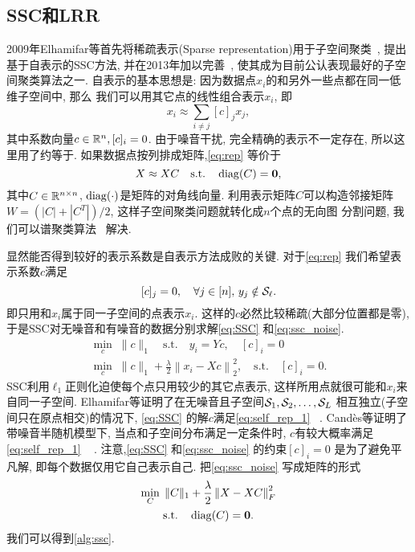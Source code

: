 \subsection{SSC和LRR}
2009年Elhamifar等首先将稀疏表示(Sparse representation)用于子空间聚类~\cite{elhamifar2009sparse}, 
提出基于自表示的SSC方法, 并在2013年加以完善~\cite{elhamifar2013sparse}, 使其成为目前公认表现最好的子空间聚类算法之一.
自表示的基本思想是: 因为数据点\(x_i\)的和另外一些点都在同一低维子空间中, 那么 
我们可以用其它点的线性组合表示\(x_i\), 即
\begin{equation}
  x_i \approx \sum_{i\neq j} [c]_j x_j, 
  \label{eq:rep}
\end{equation}
其中系数向量\(c\in \mathbb{R}^n, [c]_i = 0\). 
由于噪音干扰, 完全精确的表示不一定存在, 所以这里用了约等于.
如果数据点按列排成矩阵,\eqref{eq:rep} 等价于
\begin{equation}
  X \approx XC \quad \text{s.t.}\quad \operatorname{diag}(C) = \mathbf{0},
  \label{eq:matrix_rep}
\end{equation}
其中\(C\in \mathbb{R}^{n\times n}\), \(\operatorname{diag}(\cdot)\)是矩阵的对角线向量.
利用表示矩阵\(C\)可以构造邻接矩阵\(W=(|C|+|C^T|)/2\),
这样子空间聚类问题就转化成\(n\)个点的无向图
分割问题, 我们可以谱聚类算法~\cite{ng2002spectral} 解决.

显然能否得到较好的表示系数是自表示方法成败的关键.
对于\eqref{eq:rep} 我们希望表示系数\(c\)满足
\begin{equation}\label{eq:self_rep_1}
  [c]_j = 0, \quad  \forall j\in [n], \,y_j \notin \mathcal{S}_\ell .
\end{equation}
即只用和\(x_i\)属于同一子空间的点表示\(x_i\).
这样的\(c\)必然比较稀疏(大部分位置都是零), 
于是SSC对无噪音和有噪音的数据分别求解\eqref{eq:SSC} 和\eqref{eq:ssc_noise}. 
\begin{gather}
  \min_{c} \; \|c\|_1\quad \text{s.t.}\quad y_i=Yc, \quad [c]_i=0 \label{eq:SSC}\\
  \min_{c} \; \|c\|_1+\frac{\lambda}{2}\left\|x_i-Xc\right\|_2^2, \quad \text{s.t.} \quad
  [c]_i = 0. \label{eq:ssc_noise}
\end{gather}
SSC利用\(\ell_1\)正则化迫使每个点只用较少的其它点表示,
这样所用点就很可能和\(x_i\)来自同一子空间.
Elhamifar等证明了在无噪音且子空间\(\mathcal{S}_1, \mathcal{S}_2, \ldots, \mathcal{S}_L\)
相互独立(子空间只在原点相交)的情况下,
\eqref{eq:SSC} 的解\(c\)满足\eqref{eq:self_rep_1} ~\cite{elhamifar2013sparse}.
Cand\`{e}s等证明了带噪音半随机模型下, 当点和子空间分布满足一定条件时,
\(c\)有较大概率满足\eqref{eq:self_rep_1} ~\cite{soltanolkotabi2014robust} .
注意,\eqref{eq:SSC} 和\eqref{eq:ssc_noise} 的约束\([c]_i = 0\) 是为了避免平凡解,
即每个数据仅用它自己表示自己. 把\eqref{eq:ssc_noise} 写成矩阵的形式
\begin{equation}
  \begin{gathered}
    \min_C \; \|C\|_1+\frac{\lambda}{2}\left\|X-XC\right\|_F^2\\
    \text{s.t.} \quad \operatorname{diag}(C)=\mathbf{0}.
  \end{gathered}
  \label{eq:ssc_matrix}
\end{equation}
我们可以得到\autoref{alg:ssc}.  

